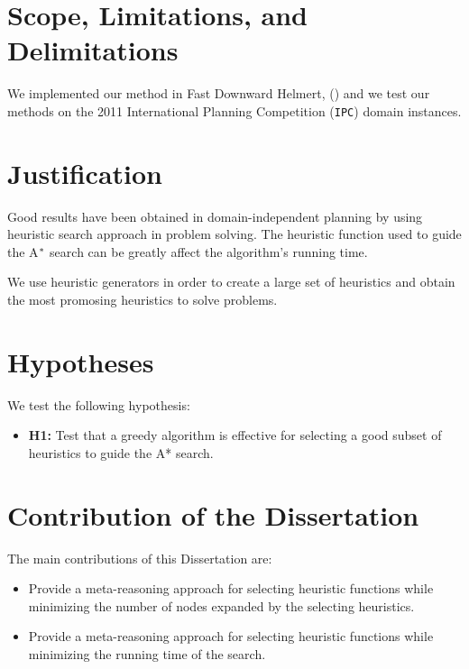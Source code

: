 \section{Scope, Limitations, and Delimitations}
\noindent
We implemented our method in Fast Downward Helmert,  (\citeyear{helmert2006fast}) and we test our methods on the 2011 International Planning Competition (\texttt{IPC}) domain instances.\\

\section{Justification}
\noindent
Good results have been obtained in domain-independent planning by using heuristic search approach in problem solving. The heuristic function used to guide the A$\sp{*}$ search can be greatly affect the algorithm's running time.

We use heuristic generators in order to create a large set of heuristics and obtain the most promosing heuristics to solve problems.

\section{Hypotheses}
\noindent
We test the following hypothesis:
\begin{itemize}
\item \textbf{H1:} Test that a greedy algorithm is effective for selecting a good subset of heuristics to guide the A* search.
\end{itemize}

\section{Contribution of the Dissertation}
\noindent
The main contributions of this Dissertation are:
\begin{itemize}
\item Provide a meta-reasoning approach for selecting heuristic functions while minimizing the number of nodes expanded by the selecting heuristics.

\item Provide a meta-reasoning approach for selecting heuristic functions while minimizing the running time of the search. 
\end{itemize}

